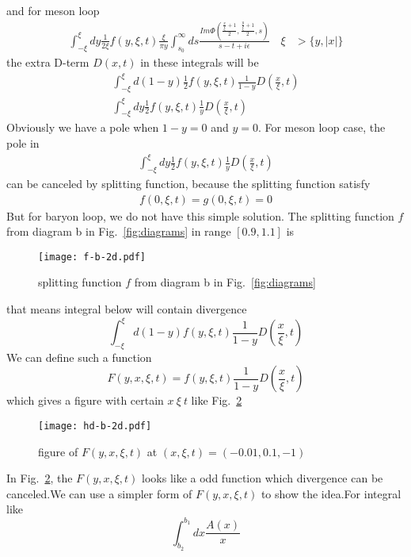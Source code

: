 \documentclass[preprintnumbers,prd,superscriptaddress,preprint]{revtex4-1}
\begin{document}
	and for meson loop 
	\begin{align*}
		\int_{-\xi}^{\xi}dy\frac{1}{2\xi}f(y,\xi,t)\frac{\xi}{\pi y}\int_{s_{0}}^{\infty}ds\frac{Im\Phi(\frac{\frac{x}{\xi}+1}{2},\frac{\frac{y}{\xi}+1}{2},s)}{s-t+i\epsilon}\quad\xi & >\{y,|x|\}
	\end{align*}
	the extra D-term $D(x,t)$ in these integrals will be 
	\begin{gather*}
		\int_{-\xi}^{\xi}d(1-y)\frac{1}{2}f(y,\xi,t)\frac{1}{1-y}D(\frac{x}{\xi},t)\\
		\int_{-\xi}^{\xi}dy\frac{1}{2}f(y,\xi,t)\frac{1}{y}D(\frac{x}{\xi},t)
	\end{gather*}
	Obviously we have a pole when $1-y=0$ and $y=0$. For meson loop case, the pole in 
	\begin{align}
		\int_{-\xi}^{\xi}dy\frac{1}{2}f(y,\xi,t)\frac{1}{y}D(\frac{x}{\xi},t)
	\end{align}
	can be canceled by splitting function, because the splitting function satisfy 
	\begin{align}
		f(0,\xi ,t)=g(0,\xi ,t)=0
	\end{align}
	But for baryon loop, we do not have this simple solution. The splitting function $f$ from diagram b in Fig.~\ref{fig:diagrams} in range $[0.9,1.1]$ is 
	\begin{figure}[htbp]
		\begin{center}
			\texttt{[image: f-b-2d.pdf]}
			\caption{splitting function $f$ from diagram b in Fig.~\ref{fig:diagrams}} 
			\label{f-b-Dterm}
		\end{center}
	\end{figure}
	that means integral below will contain divergence 
	\[
	\int_{-\xi}^{\xi}d(1-y)f(y,\xi,t)\frac{1}{1-y}D(\frac{x}{\xi},t)
	\]
	We can define such a function 
	\[
	F(y,x,\xi,t)=f(y,\xi,t)\frac{1}{1-y}D(\frac{x}{\xi},t)
	\] 
	which gives a figure with certain $x\ \xi\ t$ like Fig.~\ref{F-b-Dterm}
	\begin{figure}[htbp]
		\begin{center}
			\texttt{[image: hd-b-2d.pdf]}
			\caption{figure of $F(y,x,\xi,t)$ at $(x,\xi,t)=(-0.01,0.1,-1)$} 
			\label{F-b-Dterm}
		\end{center}
	\end{figure}
	In Fig.~\ref{F-b-Dterm}, the $F(y,x,\xi,t)$ looks like a odd function which divergence can be canceled.We can use a simpler form of $F(y,x,\xi,t)$ to show the idea.For integral like
	\[
	\int_{b_{2}}^{b_{1}}dx\frac{A(x)}{x}
	\]
	
\end{document}
